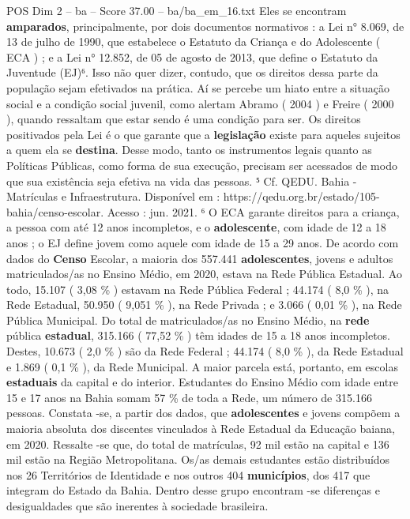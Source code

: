 \begin{textsample}{POS Dim 2 – ba – Score 37.00 – ba/ba\_em\_16.txt}
Eles se encontram \textbf{amparados}, principalmente, por dois documentos normativos : a Lei n{\EmojiFont °} 8.069, de 13 de julho de 1990, que estabelece o Estatuto da Criança e do Adolescente ( ECA ) ; e a Lei n{\EmojiFont °} 12.852, de 05 de agosto de 2013, que define o Estatuto da Juventude (EJ)⁶.
Isso não quer dizer, contudo, que os direitos dessa parte da população sejam efetivados na prática.
Aí se percebe um hiato entre a situação social e a condição social juvenil, como alertam Abramo ( 2004 ) e Freire ( 2000 ), quando ressaltam que estar sendo é uma condição para ser.
Os direitos positivados pela Lei é o que garante que a \textbf{legislação} existe para aqueles sujeitos a quem ela se \textbf{destina}.
Desse modo, tanto os instrumentos legais quanto as Políticas Públicas, como forma de sua execução, precisam ser acessados de modo que sua existência seja efetiva na vida das pessoas. ⁵ Cf.
QEDU.
Bahia - Matrículas e Infraestrutura.
Disponível em : https://qedu.org.br/estado/105-bahia/censo-escolar.
Acesso : jun. 2021. ⁶ O ECA garante direitos para a criança, a pessoa com até 12 anos incompletos, e o \textbf{adolescente}, com idade de 12 a 18 anos ; o EJ define jovem como aquele com idade de 15 a 29 anos.
De acordo com dados do \textbf{Censo} Escolar, a maioria dos 557.441 \textbf{adolescentes}, jovens e adultos matriculados/as no Ensino Médio, em 2020, estava na Rede Pública Estadual.
Ao todo, 15.107 ( 3,08 \% ) estavam na Rede Pública Federal ; 44.174 ( 8,0 \% ), na Rede Estadual, 50.950 ( 9,051 \% ), na Rede Privada ; e 3.066 ( 0,01 \% ), na Rede Pública Municipal.
Do total de matriculados/as no Ensino Médio, na \textbf{rede} pública \textbf{estadual}, 315.166 ( 77,52 \% ) têm idades de 15 a 18 anos incompletos.
Destes, 10.673 ( 2,0 \% ) são da Rede Federal ; 44.174 ( 8,0 \% ), da Rede Estadual e 1.869 ( 0,1 \% ), da Rede Municipal.
A maior parcela está, portanto, em escolas \textbf{estaduais} da capital e do interior.
Estudantes do Ensino Médio com idade entre 15 e 17 anos na Bahia somam 57 \% de toda a Rede, um número de 315.166 pessoas.
Constata -se, a partir dos dados, que \textbf{adolescentes} e jovens compõem a maioria absoluta dos discentes vinculados à Rede Estadual da Educação baiana, em 2020.
Ressalte -se que, do total de matrículas, 92 mil estão na capital e 136 mil estão na Região Metropolitana.
Os/as demais estudantes estão distribuídos nos 26 Territórios de Identidade e nos outros 404 \textbf{municípios}, dos 417 que integram do Estado da Bahia.
Dentro desse grupo encontram -se diferenças e desigualdades que são inerentes à sociedade brasileira.

\end{textsample}
